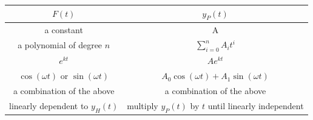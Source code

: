 \documentclass{article}
\begin{document}
\begin{table}[H]
    \centering
    \begin{tabular}{c c}
        \toprule
        \(F(t)\)                                                               & \(y_P(t)\)                                                                \\
        \midrule
        a constant                                                             & A                                                                         \\
        a polynomial of degree \(n\)                                           & \(\displaystyle \sum_{i = 0}^n A_i t^i\)                                  \\
        \(e^{kt}\)                                                             & \(A e^{kt}\)                                                              \\
        \(\cos{\left( \omega t \right)}\) or \(\sin{\left( \omega t \right)}\) & \(A_0 \cos{\left( \omega t \right)} + A_1 \sin{\left( \omega t \right)}\) \\
        a combination of the above                                             & a combination of the above                                                \\
        linearly dependent to \(y_H(t)\)                                       & multiply \(y_P(t)\) by \(t\) until linearly independent                   \\
        \bottomrule
    \end{tabular}
\end{table}
\end{document}
